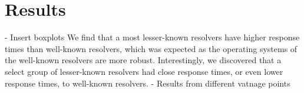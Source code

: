 \section{Results}\label{sec:results}
- Insert boxplots
We find that a most lesser-known resolvers have higher response times than well-known resolvers, which was expected as the operating systems of the well-known resolvers are more robust.
Interestingly, we discovered that a select group of lesser-known resolvers had close response times, or even lower response times, to well-known resolvers. 
- Results from different vatnage points